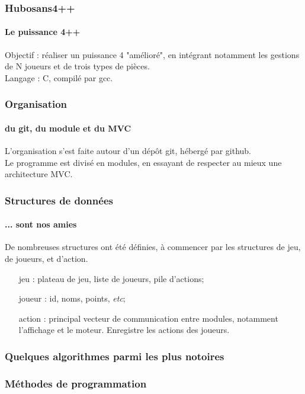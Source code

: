 \documentclass{beamer}
\begin{document}
    \begin{frame}
    \frametitle{Hubosans4++}
    \framesubtitle{Le puissance 4++}
        Objectif : réaliser un puissance 4 "amélioré", 
            en intégrant notamment les gestions de N joueurs 
            et de trois types de pièces. \\     
        Langage : C, compilé par gcc.
    \end{frame}


    \begin{frame}
    \frametitle{Organisation}
    \framesubtitle{du git, du module et du MVC}
        L'organisation s'est faite autour d'un dépôt git, 
            hébergé par github. \\ 
        Le programme est divisé en modules, en essayant 
            de respecter au mieux une architecture MVC.
    \end{frame}


    \begin{frame}
    \frametitle{Structures de données}
    \framesubtitle{... sont nos amies}
        De nombreuses structures ont été définies, à commencer 
            par les structures de jeu, de joueurs, et d'action. \\
        \begin{itemize}
        \item[jeu :] plateau de jeu, liste de joueurs, pile d'actions;\\
        \item[joueur :] id, noms, points, \textit{etc};\\
        \item[action :] principal vecteur de communication entre modules, 
            notamment l'affichage et le moteur. Enregistre les actions 
            des joueurs.
        \end{itemize}
    \end{frame}


    \begin{frame}
    \frametitle{Quelques algorithmes parmi les plus notoires}
    \framesubtitle{}
    \end{frame}


    \begin{frame}
    \frametitle{Méthodes de programmation}
    \framesubtitle{}
    \end{frame}
\end{document}
